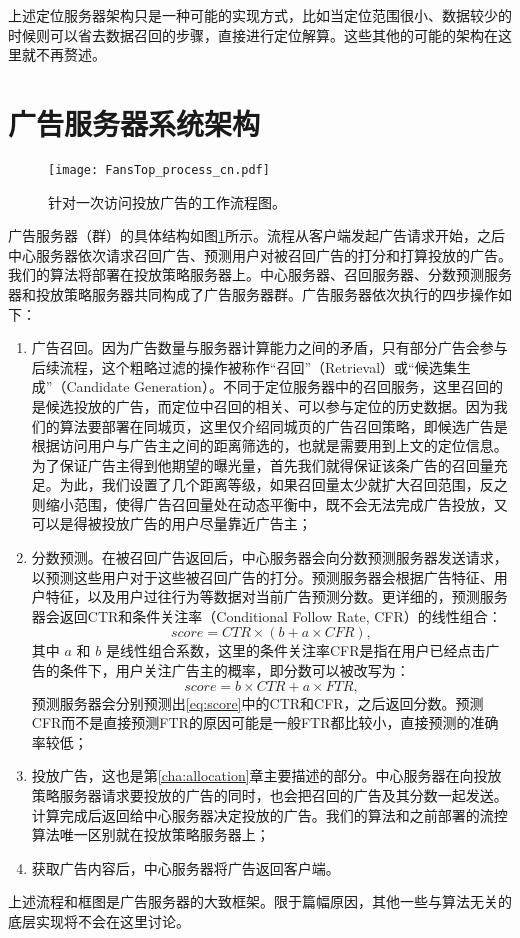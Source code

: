 上述定位服务器架构只是一种可能的实现方式，比如当定位范围很小、数据较少的时候则可以省去数据召回的步骤，直接进行定位解算。这些其他的可能的架构在这里就不再赘述。

\section{广告服务器系统架构} \label{sec:ad}

\begin{figure}[htb]
	\centering
	\texttt{[image: FansTop\_process\_cn.pdf]}
	\caption{针对一次访问投放广告的工作流程图。}
	\label{fig:fssys}
\end{figure}

广告服务器（群）的具体结构如图\ref{fig:fssys}所示。流程从客户端发起广告请求开始，之后中心服务器依次请求召回广告、预测用户对被召回广告的打分和打算投放的广告。我们的算法将部署在投放策略服务器上。中心服务器、召回服务器、分数预测服务器和投放策略服务器共同构成了广告服务器群。广告服务器依次执行的四步操作如下：
\begin{enumerate}
	\item 广告召回。因为广告数量与服务器计算能力之间的矛盾，只有部分广告会参与后续流程，这个粗略过滤的操作被称作“召回”（Retrieval）或“候选集生成”（Candidate Generation）。不同于定位服务器中的召回服务，这里召回的是候选投放的广告，而定位中召回的相关、可以参与定位的历史数据。因为我们的算法要部署在同城页，这里仅介绍同城页的广告召回策略，即候选广告是根据访问用户与广告主之间的距离筛选的，也就是需要用到上文的定位信息。为了保证广告主得到他期望的曝光量，首先我们就得保证该条广告的召回量充足。为此，我们设置了几个距离等级，如果召回量太少就扩大召回范围，反之则缩小范围，使得广告召回量处在动态平衡中，既不会无法完成广告投放，又可以是得被投放广告的用户尽量靠近广告主；
	\item 分数预测。在被召回广告返回后，中心服务器会向分数预测服务器发送请求，以预测这些用户对于这些被召回广告的打分。预测服务器会根据广告特征、用户特征，以及用户过往行为等数据对当前广告预测分数。更详细的，预测服务器会返回CTR和条件关注率（Conditional Follow Rate, CFR）的线性组合：
	\begin{equation}
		score = CTR \times  (b + a \times CFR), \label{eq:score}
	\end{equation}
	其中 $a$ 和 $b$ 是线性组合系数，这里的条件关注率CFR是指在用户已经点击广告的条件下，用户关注广告主的概率，即分数可以被改写为：
	\begin{equation}
	score = b \times CTR + a \times FTR, 
	\end{equation}
	预测服务器会分别预测出\eqref{eq:score}中的CTR和CFR，之后返回分数。预测CFR而不是直接预测FTR的原因可能是一般FTR都比较小，直接预测的准确率较低；
	\item 投放广告，这也是第\ref{cha:allocation}章主要描述的部分。中心服务器在向投放策略服务器请求要投放的广告的同时，也会把召回的广告及其分数一起发送。计算完成后返回给中心服务器决定投放的广告。我们的算法和之前部署的流控算法唯一区别就在投放策略服务器上；
	\item 获取广告内容后，中心服务器将广告返回客户端。
\end{enumerate}

上述流程和框图是广告服务器的大致框架。限于篇幅原因，其他一些与算法无关的底层实现将不会在这里讨论。





